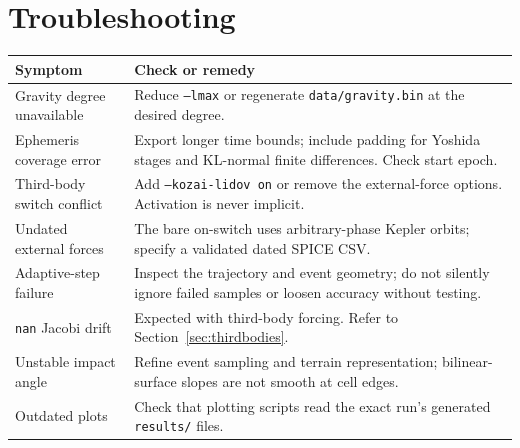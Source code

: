 \documentclass[11pt,a4paper]{article}
\newcommand{\opt}[1]{\texttt{#1}}
\newcommand{\pathcode}[1]{\nolinkurl{#1}}
\begin{document}
\section{Troubleshooting}
\begin{tabularx}{\linewidth}{@{}p{.35\linewidth}X@{}}
\toprule Symptom & Check or remedy\\\midrule
Gravity degree unavailable & Reduce \opt{--lmax} or regenerate \pathcode{data/gravity.bin} at the desired degree.\\
Ephemeris coverage error & Export longer time bounds; include padding for Yoshida stages and KL-normal finite differences. Check start epoch.\\
Third-body switch conflict & Add \opt{--kozai-lidov on} or remove the external-force options. Activation is never implicit.\\
Undated external forces & The bare on-switch uses arbitrary-phase Kepler orbits; specify a validated dated SPICE CSV.\\
Adaptive-step failure & Inspect the trajectory and event geometry; do not silently ignore failed samples or loosen accuracy without testing.\\
\opt{nan} Jacobi drift & Expected with third-body forcing. Refer to Section~\ref{sec:thirdbodies}.\\
Unstable impact angle & Refine event sampling and terrain representation; bilinear-surface slopes are not smooth at cell edges.\\
Outdated plots & Check that plotting scripts read the exact run's generated \pathcode{results/} files.\\
\bottomrule
\end{tabularx}
\end{document}
